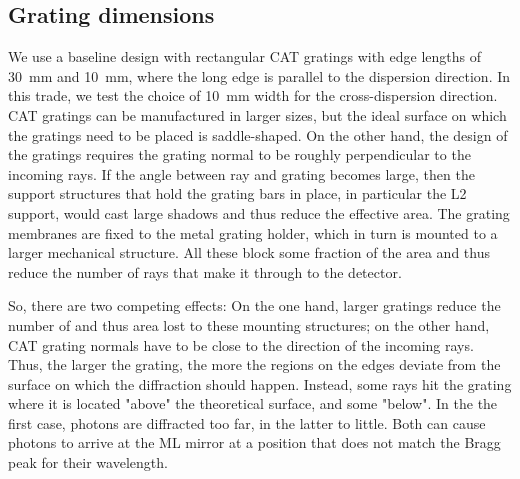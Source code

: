 \documentclass[]{spie}  %
\begin{document}
\subsection{Grating dimensions}
We use a baseline design with rectangular CAT gratings with edge
lengths of 30~mm and 10~mm, where the long edge is parallel to the
dispersion direction. In this trade, we test the choice of 10~mm width
for the cross-dispersion direction. CAT gratings can be manufactured
in larger sizes, but the ideal surface on which the gratings need to
be placed is saddle-shaped. On the other hand, the design of the
gratings requires the grating normal to be roughly perpendicular to
the incoming rays. If the angle between ray and grating becomes large,
then the support structures that hold the grating bars in place, in
particular the L2 support,
would cast large shadows and thus reduce the effective area. The
grating membranes are fixed to the metal grating holder, which in turn
is mounted to a larger mechanical structure. All these block some
fraction of the area and thus reduce the number of rays that make it
through to the detector.

So, there are two competing effects: On the one hand, larger gratings
reduce the number of and thus area lost to these mounting structures;
on the other hand, CAT grating
normals have to be close to the direction of the incoming rays. Thus, the
larger the grating, the more the regions on the edges deviate from
the surface on which the diffraction should happen. Instead, some rays
hit the grating where it is located "above" the theoretical surface,
and some "below". In the the first case, photons are diffracted too
far, in the latter to little. Both can cause photons to arrive at the
ML mirror at a position that does not match the Bragg peak for their
wavelength.
\end{document}
